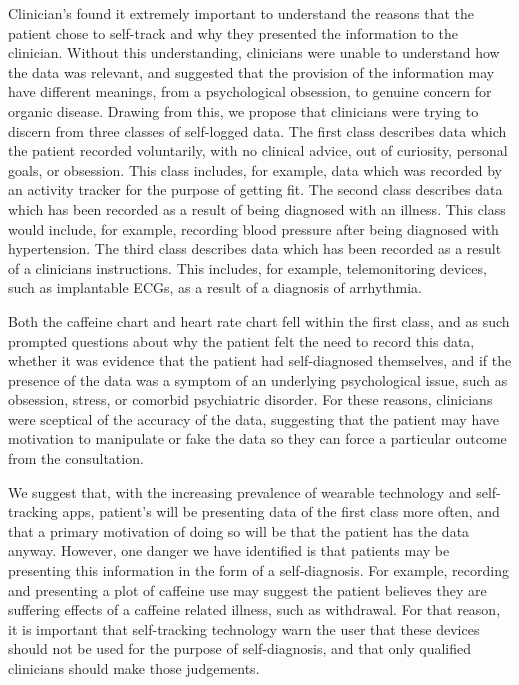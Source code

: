 \documentclass{sigchi}
\begin{document}

%

Clinician's found it extremely important to understand the reasons that the patient chose to self-track and why they presented the information to the clinician. Without this understanding, clinicians were unable to understand how the data was relevant, and suggested that the provision of the information may have different meanings, from a psychological obsession, to genuine concern for organic disease. Drawing from this, we propose that clinicians were trying to discern from three classes of self-logged data. The first class describes data which the patient recorded voluntarily, with no clinical advice, out of curiosity, personal goals, or obsession. This class includes, for example, data which was recorded by an activity tracker for the purpose of getting fit. The second class describes data which has been recorded as a result of being diagnosed with an illness. This class would include, for example, recording blood pressure after being diagnosed with hypertension. The third class describes data which has been recorded as a result of a clinicians instructions. This includes, for example, telemonitoring devices, such as implantable ECGs, as a result of a diagnosis of arrhythmia.

Both the caffeine chart and heart rate chart fell within the first class, and as such prompted questions about why the patient felt the need to record this data, whether it was evidence that the patient had self-diagnosed themselves, and if the presence of the data was a symptom of an underlying psychological issue, such as obsession, stress, or comorbid psychiatric disorder. For these reasons, clinicians were sceptical of the accuracy of the data, suggesting that the patient may have motivation to manipulate or fake the data so they can force a particular outcome from the consultation.

We suggest that, with the increasing prevalence of wearable technology and self-tracking apps, patient's will be presenting data of the first class more often, and that a primary motivation of doing so will be that the patient has the data anyway. However, one danger we have identified is that patients may be presenting this information in the form of a self-diagnosis. For example, recording and presenting a plot of caffeine use may suggest the patient believes they are suffering effects of a caffeine related illness, such as withdrawal. For that reason, it is important that self-tracking technology warn the user that these devices should not be used for the purpose of self-diagnosis, and that only qualified clinicians should make those judgements.
\end{document}
